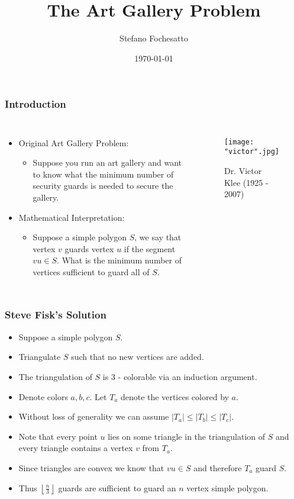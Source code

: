 \documentclass{beamer}
\title{The Art Gallery Problem}
\subtitle{}
\author{Stefano Fochesatto}
\institute{University of Alaska Fairbanks}
\date{\today}
\begin{document}
 \begin{frame}
\titlepage
\end{frame}

\begin{frame}
\frametitle{Introduction}
\begin{columns}
\begin{itemize}
	\item Original Art Gallery Problem: 
		\begin{itemize}
		\item Suppose you run an art gallery and want to know what the minimum number of security guards is needed to secure the gallery.
		\vfill
		\end{itemize}
	\vfill
	\vfill
	\item Mathematical Interpretation:
		\begin{itemize}
		\item Suppose a simple polygon $S$, we say that vertex $v$ guards vertex $u$ if the segment $vu \in S$. What is the minimum number of vertices sufficient to guard all of $S$.
		\end{itemize}
	\end{itemize}
\begin{figure}[H]
		\centering
		\texttt{[image: "victor".jpg]}
		\caption{Dr. Victor Klee (1925 - 2007)}
		\end{figure}

\end{columns}
\end{frame}




\begin{frame}
\frametitle{Steve Fisk's Solution}
\begin{center}
\begin{itemize}
\item Suppose a simple polygon $S$. 
\item Triangulate $S$ such that no new vertices are added. 
\item The triangulation of $S$ is 3 - colorable via an induction argument. 
\item Denote colors $a,b,c$. Let $T_a$ denote the vertices colored by $a$. 
\item Without loss of generality we can assume $|T_a|\leq |T_b| \leq |T_c|$. 
\item Note that every point $u$ lies on some triangle in the triangulation of $S$ and every triangle contains a vertex $v$ from $T_a$. 
\item Since triangles are convex we know that $vu \in S$ and therefore $T_a$ guard $S$. 
\item Thus $\left \lfloor{\frac{n}{3}}\right \rfloor$ guards are sufficient to guard an $n$ vertex simple polygon. 
\end{itemize}
\end{center}
\end{frame}
\end{document}
